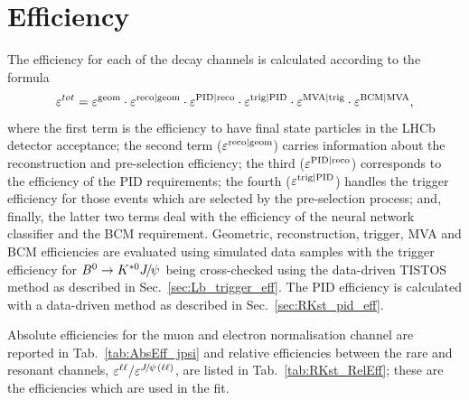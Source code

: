 \section{Efficiency}
\label{sec:RKst_efficiency}

The efficiency for each of the decay channels is calculated according to the formula
%
$$\varepsilon^{tot} = \varepsilon^{\rm geom} \cdot \varepsilon^{\rm reco|geom} \cdot \varepsilon^{\rm PID|reco} \cdot \varepsilon^{\rm trig|PID} \cdot \varepsilon^{\rm MVA|trig}\cdot \varepsilon^{\rm BCM|MVA},$$
%
where the first term is the efficiency to have final state particles in the LHCb detector 
acceptance; the second term ($\varepsilon^{\rm reco|geom}$) carries information about the reconstruction and pre-selection efficiency;
the third ($\varepsilon^{\rm PID|reco}$) corresponds to the efficiency of the PID requirements;
the fourth ($\varepsilon^{\rm trig|PID}$) handles the trigger efficiency for those events which are selected by the pre-selection 
process; and, finally, the latter two terms deal with the efficiency of the neural network classifier and the BCM requirement.
Geometric, reconstruction, trigger, MVA and BCM efficiencies are evaluated using simulated data samples with the trigger efficiency
for $\Bz\to\Kstarz\jpsi$ being cross-checked using the data-driven TISTOS method as described in Sec.~\ref{sec:Lb_trigger_eff}.
The PID efficiency is calculated with a data-driven method as described in Sec.~\ref{sec:RKst_pid_eff}.

Absolute efficiencies for the muon and electron normalisation channel are reported in Tab.~\ref{tab:AbsEff_jpsi}
and relative efficiencies between the rare and resonant channels, 
$\varepsilon^{\ell\ell}/\varepsilon^{\jpsi(\ell\ell)}$, are listed in Tab.~\ref{tab:RKst_RelEff};
these are the efficiencies which are used in the fit.

%
%
%
%

